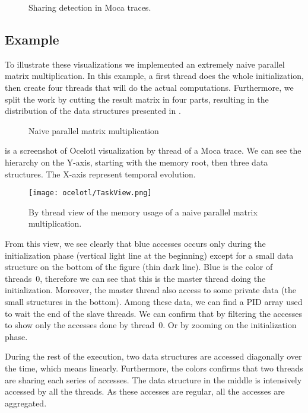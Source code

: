 \begin{figure}[htb]
    \centering
    
    \caption{Sharing detection in Moca traces.}
    \label{fig:sharing-detection}
\end{figure}

\subsection{Example}

To illustrate these visualizations we implemented an extremely naive parallel matrix multiplication.
In this example, a first thread does the whole initialization, then create four threads that will do the actual computations.
Furthermore, we split the work by cutting the result matrix in four parts, resulting in the distribution of the data structures presented in .

\begin{figure}[htb]
    \centering
    
    \caption{Naive parallel matrix multiplication}
    \label{fig:mat-mult-par}
\end{figure}

 is a screenshot of \gls{Ocelotl} visualization by thread of a \gls{Moca} trace.
We can see the hierarchy on the Y-axis, starting with the memory root, then three data structures.
The X-axis represent temporal evolution.

\begin{figure}[htb]
    \centering
    \texttt{[image: ocelotl/TaskView.png]}
    \caption{By thread view of the memory usage of a naive parallel matrix multiplication.}
    \label{fig:ocelotl-th0}
\end{figure}

From this view, we see clearly that  blue accesses occurs only during the initialization phase (vertical light line at the beginning) except for a small data structure on the bottom of the figure (thin dark line).
Blue is the color of threads~$0$, therefore we can see that this is the master thread doing the initialization.
Moreover, the master thread also access to some private data (the small structures in the bottom).
Among these data, we can find a \gls{PID} array used to wait the end of the slave threads.
We can confirm that by filtering the accesses to show only the accesses done by thread~$0$.
Or by zooming on the initialization phase.

During the rest of the execution, two data structures are accessed diagonally over the time, which means linearly.
Furthermore, the colors confirms that two threads are sharing each series of accesses.
The data structure in the middle is intensively accessed by all the threads.
As these accesses are regular, all the accesses are aggregated.

